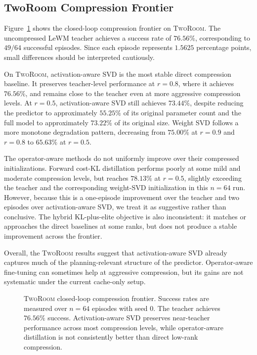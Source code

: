 \documentclass[11pt]{article}
\begin{document}
\subsection{TwoRoom Compression Frontier}
\label{sec:tworoom_frontier}

Figure~\ref{fig:tworoom-frontier} shows the closed-loop compression frontier on \textsc{TwoRoom}. The uncompressed LeWM teacher achieves a success rate of \(76.56\%\), corresponding to \(49/64\) successful episodes. Since each episode represents \(1.5625\) percentage points, small differences should be interpreted cautiously.

On \textsc{TwoRoom}, activation-aware SVD is the most stable direct compression baseline. It preserves teacher-level performance at \(r=0.8\), where it achieves \(76.56\%\), and remains close to the teacher even at more aggressive compression levels. At \(r=0.5\), activation-aware SVD still achieves \(73.44\%\), despite reducing the predictor to approximately \(55.25\%\) of its original parameter count and the full model to approximately \(73.22\%\) of its original size. Weight SVD follows a more monotone degradation pattern, decreasing from \(75.00\%\) at \(r=0.9\) and \(r=0.8\) to \(65.63\%\) at \(r=0.5\).

The operator-aware methods do not uniformly improve over their compressed initializations. Forward cost-KL distillation performs poorly at some mild and moderate compression levels, but reaches \(78.13\%\) at \(r=0.5\), slightly exceeding the teacher and the corresponding weight-SVD initialization in this \(n=64\) run. However, because this is a one-episode improvement over the teacher and two episodes over activation-aware SVD, we treat it as suggestive rather than conclusive. The hybrid KL-plus-elite objective is also inconsistent: it matches or approaches the direct baselines at some ranks, but does not produce a stable improvement across the frontier.

Overall, the \textsc{TwoRoom} results suggest that activation-aware SVD already captures much of the planning-relevant structure of the predictor. Operator-aware fine-tuning can sometimes help at aggressive compression, but its gains are not systematic under the current cache-only setup.

\begin{figure}[t]
    \centering
    \caption{
    \textsc{TwoRoom} closed-loop compression frontier.
    Success rates are measured over \(n=64\) episodes with seed \(0\).
    The teacher achieves \(76.56\%\) success. Activation-aware SVD preserves near-teacher performance across most compression levels, while operator-aware distillation is not consistently better than direct low-rank compression.
    }
    \label{fig:tworoom-frontier}
\end{figure}
\end{document}
